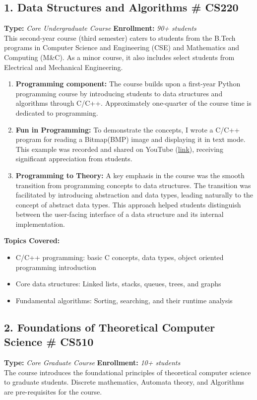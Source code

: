 \documentclass[11pt,a4paper,sans]{moderncv} %
\begin{document}
\subsection*{1. Data Structures and Algorithms \null\hfill \# CS220}
\textbf{Type:} \emph{Core Undergraduate Course} \null\hfill \textbf{Enrollment:} \emph{90+ students} \\
This second-year course (third semester) caters to students from the B.Tech programs in Computer Science and Engineering (CSE) and Mathematics and Computing (M\&C). As a minor course, it also includes select students from Electrical and Mechanical Engineering.

\begin{enumerate}
 \item \textbf{Programming component:} The course builds upon a first-year Python programming course by introducing students to data structures and algorithms through C/C++. Approximately one-quarter of the course time is dedicated to programming.
 \item \textbf{Fun in Programming:} To demonstrate the concepts, I wrote a C/C++ program for reading a Bitmap(BMP) image and displaying it in text mode. This example was recorded and shared on YouTube (\href{https://youtu.be/xB0ifokXdWs}{link}), receiving significant appreciation from students.
\item \textbf{Programming to Theory:} A key emphasis in the course was the smooth transition from programming concepts to data structures. The transition was facilitated by introducing abstraction and data types, leading naturally to the concept of abstract data types. This approach helped students distinguish between the user-facing interface of a data structure and its internal implementation.
\end{enumerate}


\textbf{Topics Covered:}
\begin{itemize}
    \item C/C++ programming: basic C concepts, data types, object oriented programming introduction
    \item Core data structures: Linked lists, stacks, queues, trees, and graphs
    \item Fundamental algorithms: Sorting, searching, and their runtime analysis
\end{itemize}

\subsection*{2. Foundations of Theoretical Computer Science \null\hfill \# CS510}
\textbf{Type:} \emph{Core Graduate Course} \null\hfill \textbf{Enrollment:} \emph{10+ students} \\
The course introduces the foundational principles of theoretical computer science to graduate students. Discrete mathematics, Automata theory, and Algorithms are pre-requisites for the course.
\end{document}
